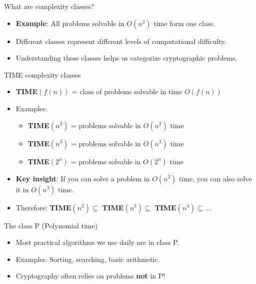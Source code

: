 \documentclass[aspectratio=169, lualatex, handout]{beamer}
\begin{document}
\begin{frame}{What are complexity classes?}
	\begin{itemize}[<+->]
		\item \textbf{Example}: All problems solvable in $O(n^2)$ time form one class.
		\item Different classes represent different levels of computational difficulty.
		\item Understanding these classes helps us categorize cryptographic problems.
	\end{itemize}
\end{frame}

\begin{frame}{TIME complexity classes}
	\begin{itemize}[<+->]
		\item \textbf{TIME}$(f(n))$ = class of problems solvable in time $O(f(n))$
		\item Examples:
		      \begin{itemize}
			      \item \textbf{TIME}$(n^2)$ = problems solvable in $O(n^2)$ time
			      \item \textbf{TIME}$(n^3)$ = problems solvable in $O(n^3)$ time
			      \item \textbf{TIME}$(2^n)$ = problems solvable in $O(2^n)$ time
		      \end{itemize}
		\item \textbf{Key insight}: If you can solve a problem in $O(n^2)$ time, you can also solve it in $O(n^3)$ time.
		\item Therefore: \textbf{TIME}$(n^2) \subseteq$ \textbf{TIME}$(n^3) \subseteq$ \textbf{TIME}$(n^4) \subseteq \ldots$
	\end{itemize}
\end{frame}

\begin{frame}{The class P (Polynomial time)}
	\begin{itemize}[<+->]
		\item Most practical algorithms we use daily are in class P.
		\item Examples: Sorting, searching, basic arithmetic.
		\item Cryptography often relies on problems \textbf{not} in P!
	\end{itemize}
\end{frame}
\end{document}
